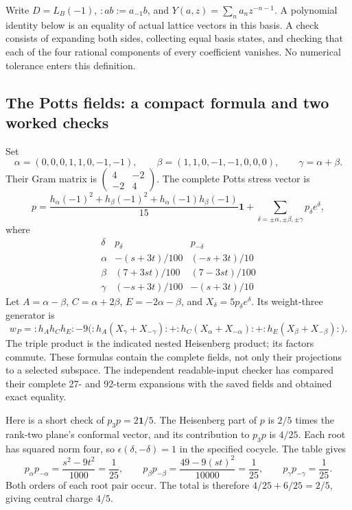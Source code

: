 Write $D=L_B(-1)$, $:ab:=a_{-1}b$, and
$Y(a,z)=\sum_n a_nz^{-n-1}$. A polynomial identity below is an
equality of actual lattice vectors in this basis. A check consists of
expanding both sides, collecting equal basis states, and checking that
each of the four rational components of every coefficient vanishes.
No numerical tolerance enters this definition.

\subsection{The Potts fields: a compact formula and two worked checks}

Set
\[
 \alpha=(0,0,0,1,1,0,-1,-1),\qquad
 \beta=(1,1,0,-1,-1,0,0,0),\qquad \gamma=\alpha+\beta.
\]
Their Gram matrix is $\left(\begin{smallmatrix}4&-2\\-2&4\end{smallmatrix}\right)$.
The complete Potts stress vector is
\begin{equation}
 p=\frac{h_\alpha(-1)^2+h_\beta(-1)^2+
                 h_\alpha(-1)h_\beta(-1)}{15}\mathbf1
     +\sum_{\delta=\pm\alpha,\pm\beta,\pm\gamma}p_\delta e^\delta,
 \label{hr:potts-field}
\end{equation}
where
\[
\begin{array}{c|rr}
 \delta&p_\delta&p_{-\delta}\\\hline
 \alpha&-(s+3t)/100&(-s+3t)/10\\
 \beta&(7+3st)/100&(7-3st)/100\\
 \gamma&(-s+3t)/100&-(s+3t)/10
\end{array}
\]
Let $A=\alpha-\beta$, $C=\alpha+2\beta$, $E=-2\alpha-\beta$,
and $X_\delta=5p_\delta e^\delta$. Its weight-three generator is
\begin{equation}
 w_P=:h_Ah_Ch_E:
 -9\bigl(:h_A(X_\gamma+X_{-\gamma}):
       +:h_C(X_\alpha+X_{-\alpha}):
       +:h_E(X_\beta+X_{-\beta}):\bigr).
 \label{hr:potts-primary}
\end{equation}
The triple product is the indicated nested Heisenberg product; its
factors commute. These formulas contain the complete fields, not only
their projections to a selected subspace. The independent readable-input
checker has compared their complete 27- and 92-term expansions with
the saved fields and obtained exact equality.

Here is a short check of $p_3p=2\mathbf1/5$. The Heisenberg part of
$p$ is $2/5$ times the rank-two plane's conformal vector, and its
contribution to $p_3p$ is $4/25$. Each root has squared norm four,
so $\epsilon(\delta,-\delta)=1$ in the specified cocycle. The table
gives
\[
 p_\alpha p_{-\alpha}
   =\frac{s^2-9t^2}{1000}=\frac1{25},\qquad
 p_\beta p_{-\beta}
   =\frac{49-9(st)^2}{10000}=\frac1{25},\qquad
 p_\gamma p_{-\gamma}=\frac1{25}.
\]
Both orders of each root pair occur. The total is therefore
$4/25+6/25=2/5$, giving central charge $4/5$.

